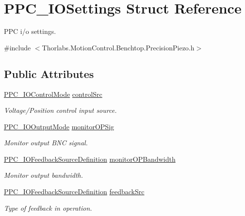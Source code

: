\hypertarget{struct_p_p_c___i_o_settings}{}\section{P\+P\+C\+\_\+\+I\+O\+Settings Struct Reference}
\label{struct_p_p_c___i_o_settings}


P\+PC i/o settings.  




{\ttfamily \#include $<$Thorlabs.\+Motion\+Control.\+Benchtop.\+Precision\+Piezo.\+h$>$}

\subsection*{Public Attributes}
\begin{DoxyCompactItemize}
\item 
\hyperlink{group___benchtop_precision_piezo_gad49093cdbcb82112f991ef860e01c020}{P\+P\+C\+\_\+\+I\+O\+Control\+Mode} \hyperlink{struct_p_p_c___i_o_settings_ae30ae63a9fb6b9ffe1c446012fc4605f}{control\+Src}
\begin{DoxyCompactList}\small\item\em Voltage/\+Position control input source. \end{DoxyCompactList}\item 
\hyperlink{group___benchtop_precision_piezo_ga64728fb0465f2c9710369c2522d67c2e}{P\+P\+C\+\_\+\+I\+O\+Output\+Mode} \hyperlink{struct_p_p_c___i_o_settings_a360b86efc11cc5332343cbf001adba50}{monitor\+O\+P\+Sig}
\begin{DoxyCompactList}\small\item\em Monitor output B\+NC signal. \end{DoxyCompactList}\item 
\hyperlink{group___benchtop_precision_piezo_ga72e3a198a9389d179464550e7ff6b115}{P\+P\+C\+\_\+\+I\+O\+Feedback\+Source\+Definition} \hyperlink{struct_p_p_c___i_o_settings_a7438940f9ae0e57eef2c4199c40aa0b0}{monitor\+O\+P\+Bandwidth}
\begin{DoxyCompactList}\small\item\em Monitor output bandwidth. \end{DoxyCompactList}\item 
\hyperlink{group___benchtop_precision_piezo_ga72e3a198a9389d179464550e7ff6b115}{P\+P\+C\+\_\+\+I\+O\+Feedback\+Source\+Definition} \hyperlink{struct_p_p_c___i_o_settings_aba2cf51fb81d7c62d45b71a6da271a50}{feedback\+Src}
\begin{DoxyCompactList}\small\item\em Type of feedback in operation. \end{DoxyCompactList}\item 

\end{DoxyCompactItemize}
